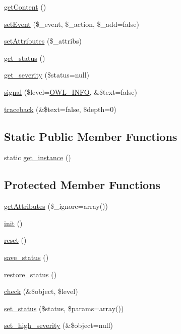 \begin{DoxyCompactItemize}
\item 
\hyperlink{classBaseElement_af8c86b93bcdcfbc415bf96c622dc5516}{getContent} ()
\item 
\hyperlink{classBaseElement_ad5789f45f16aaa144716ee8558069c31}{setEvent} (\$\_\-event, \$\_\-action, \$\_\-add=false)
\item 
\hyperlink{classBaseElement_aa623b042d23a5b77add8b3c452ec5855}{setAttributes} (\$\_\-attribs)
\item 
\hyperlink{class__OWL_a99ec771fa2c5c279f80152cc09e489a8}{get\_\-status} ()
\item 
\hyperlink{class__OWL_adf9509ef96858be7bdd9414c5ef129aa}{get\_\-severity} (\$status=null)
\item 
\hyperlink{class__OWL_a51ba4a16409acf2a2f61f286939091a5}{signal} (\$level=\hyperlink{owl_8severitycodes_8php_a139328861128689f2f4def6a399d9057}{OWL\_\-INFO}, \&\$text=false)
\item 
\hyperlink{class__OWL_aa29547995d6741b7d2b90c1d4ea99a13}{traceback} (\&\$text=false, \$depth=0)
\end{DoxyCompactItemize}
\subsection*{Static Public Member Functions}
\begin{DoxyCompactItemize}
\item 
static \hyperlink{classDocument_a840881b31974bd6f307fd6dcf73bc9c3}{get\_\-instance} ()
\end{DoxyCompactItemize}
\subsection*{Protected Member Functions}
\begin{DoxyCompactItemize}
\item 
\hyperlink{classBaseElement_ae8237038633fc53db818f36da1940297}{getAttributes} (\$\_\-ignore=array())
\item 
\hyperlink{class__OWL_ae0ef3ded56e8a6b34b6461e5a721cd3e}{init} ()
\item 
\hyperlink{class__OWL_a2f2a042bcf31965194c03033df0edc9b}{reset} ()
\item 
\hyperlink{class__OWL_a9e49b9c76fbc021b244c6915ea536d71}{save\_\-status} ()
\item 
\hyperlink{class__OWL_a465eeaf40edd9f9c848841700c32ce55}{restore\_\-status} ()
\item 
\hyperlink{class__OWL_ad6f4f6946f40199dd0333cf219fa500e}{check} (\&\$object, \$level)
\item 
\hyperlink{class__OWL_aea912d0ede9b3c2a69b79072d94d4787}{set\_\-status} (\$status, \$params=array())
\item 
\hyperlink{class__OWL_a576829692a3b66e3d518853bf43abae3}{set\_\-high\_\-severity} (\&\$object=null)
\end{DoxyCompactItemize}

